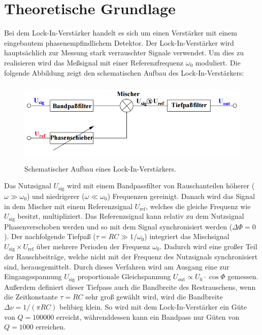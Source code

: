 \section{Theoretische Grundlage}
\label{sec:Theorie}
Bei dem Lock-In-Verstärker handelt es sich um einen Verstärker mit einem eingebautem phasenempfindlichem Detektor. Der Lock-In-Verstärker wird hauptsächlich zur Messung stark verrauschter Signale verwendet. Um dies zu realisieren wird das Meßsignal mit einer Referenzfrequenz $\omega_\text{0}$ moduliert. Die folgende Abbildung zeigt den schematischen Aufbau des Lock-In-Verstärkers:
\begin{figure}[H]
	\centering
	\includegraphics[height=4cm]{picture/sLIV.png}
	\caption{Schematischer Aufbau eines Lock-In-Verstärkers. \cite[1]{sample}}
  \label{img:sLIV}
\end{figure}
Das Nutzsignal $U_\text{sig}$ wird mit einem Bandpassfilter von Rauschanteilen höherer ($\omega \gg \omega_\text{0}$) und niedrigerer ($\omega \ll \omega_\text{0}$) Frequenzen gereinigt. Danach wird das Signal in dem Mischer mit einem Referenzsignal $U_\text{ref}$, welches die gleiche Frequenz wie $U_\text{sig}$ besitzt, multipliziert. Das Referenzsignal kann relativ zu dem Nutzsignal Phasenverschoben werden und so mit dem Signal synchronisiert werden ($\Delta \Phi = 0$). Der nachfolgende Tiefpaß ($\tau = RC \gg 1/ \omega_\text{0}$) integriert das Mischsignal $U_\text{sig} \times U_\text{ref}$
über mehrere Perioden der Frequenz $\omega_\text{0}$. Dadurch wird eine großer Teil der Rauschbeiträge, welche nicht mit der Frequenz des Nutzsignals synchronisiert sind, herausgemittelt. Durch dieses Verfahren wird am Ausgang eine zur Eingangsspannung $U_\text{sig}$ proportionale Gleichspannung $U_\text{out} \propto U_\text{0} \cdot \cos \Phi$ gemessen. Außerdem definiert dieser Tiefpass auch die Bandbreite des Restrauschens, wenn die Zeitkonstante $\tau = RC$ sehr groß gewählt wird, wird die Bandbreite $\Delta \nu = 1/(\pi RC)$ belibieg klein. So wird mit dem Lock-In-Verstärker ein Güte von $Q = 100000$ erreicht, währenddessen kann ein Bandpass nur Güten von $Q = 1000$ erreichen.
